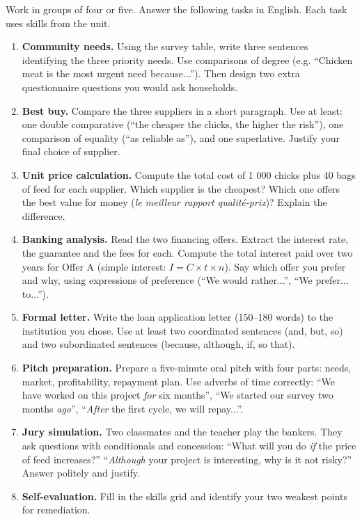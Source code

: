 \documentclass[11pt]{article}
\newcounter{popsec}
\newcounter{popsub}
\newcommand{\courssub}[1]{%
  \stepcounter{popsub}%
  \par\vspace{9pt}\noindent{\popxbold\fontsize{11.5}{13}\selectfont\color{popink}{\color{poporange}\thepopsec.\thepopsub}\hspace{6pt}#1}\par\nopagebreak\vspace{4pt}
}
\begin{document}
\courssub{Consignes}

Work in groups of four or five. Answer the following tasks in English. Each task uses skills from the unit.

\begin{enumerate}
\item \textbf{Community needs.} Using the survey table, write three sentences identifying the three priority needs. Use comparisons of degree (e.g. ``Chicken meat is the most urgent need because...''). Then design two extra questionnaire questions you would ask households.
\item \textbf{Best buy.} Compare the three suppliers in a short paragraph. Use at least: one double comparative (``the cheaper the chicks, the higher the risk''), one comparison of equality (``as reliable as''), and one superlative. Justify your final choice of supplier.
\item \textbf{Unit price calculation.} Compute the total cost of 1 000 chicks plus 40 bags of feed for each supplier. Which supplier is the cheapest? Which one offers the best value for money (\emph{le meilleur rapport qualité-prix})? Explain the difference.
\item \textbf{Banking analysis.} Read the two financing offers. Extract the interest rate, the guarantee and the fees for each. Compute the total interest paid over two years for Offer A (simple interest: $I = C \times t \times n$). Say which offer you prefer and why, using expressions of preference (``We would rather...'', ``We prefer... to...'').
\item \textbf{Formal letter.} Write the loan application letter (150--180 words) to the institution you chose. Use at least two coordinated sentences (and, but, so) and two subordinated sentences (because, although, if, so that).
\item \textbf{Pitch preparation.} Prepare a five-minute oral pitch with four parts: needs, market, profitability, repayment plan. Use adverbs of time correctly: ``We have worked on this project \emph{for} six months'', ``We started our survey two months \emph{ago}'', ``\emph{After} the first cycle, we will repay...''.
\item \textbf{Jury simulation.} Two classmates and the teacher play the bankers. They ask questions with conditionals and concession: ``What will you do \emph{if} the price of feed increases?'' ``\emph{Although} your project is interesting, why is it not risky?'' Answer politely and justify.
\item \textbf{Self-evaluation.} Fill in the skills grid and identify your two weakest points for remediation.
\end{enumerate}
\end{document}
